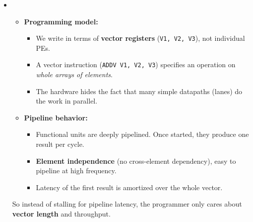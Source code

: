 \begin{itemize}
    \item {}
    \begin{itemize}
        \item[\textcolor{Green3}{\faIcon{book}}] \textcolor{Green3}{\textbf{Programming model:}}
        \begin{itemize}
            \item We write in terms of \textbf{vector registers} (\texttt{V1, V2, V3}), not individual PEs.
            \item A vector instruction (\texttt{ADDV V1, V2, V3}) specifies an operation on \emph{whole arrays of elements}.
            \item The hardware hides the fact that many simple datapaths (lanes) do the work in parallel.
        \end{itemize}
        \item[\textcolor{Green3}{\faIcon{layer-group}}] \textcolor{Green3}{\textbf{Pipeline behavior:}}
        \begin{itemize}
            \item Functional units are deeply pipelined. Once started, they produce one result per cycle.
            \item \textbf{Element independence} (no cross-element dependency), easy to pipeline at high frequency.
            \item Latency of the first result is amortized over the whole vector.
        \end{itemize}
    \end{itemize}
    So instead of stalling for pipeline latency, the programmer only cares about \textbf{vector length} and throughput.
\end{itemize}

\newpage

